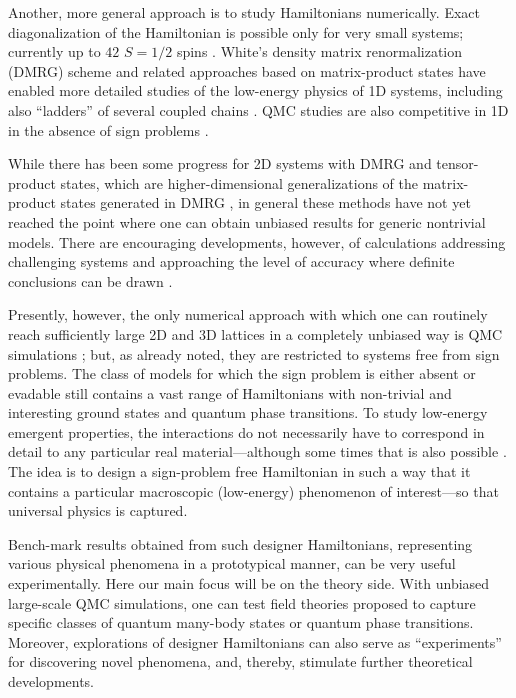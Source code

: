 \documentclass[10pt,pre,aps,twocolumn,showpacs,subscriptaddresses,floatfix]{revtex4}
\begin{document}
Another, more general approach is to study Hamiltonians numerically. Exact diagonalization of the Hamiltonian is possible 
only for very small systems; currently up to $42$ $S=1/2$ spins \cite{Nakano11,Lauchli11}. White's density matrix 
renormalization (DMRG) scheme \cite{White92} and related approaches based on matrix-product states \cite{Schollwock05} 
have enabled more detailed studies of the low-energy physics of 1D systems, including also ``ladders'' of several coupled chains
\cite{Dagotto96}. QMC studies are also competitive in 1D in the absence of sign problems \cite{Sandvik04,Jeckelmann02,Mund09}.

While there has been some progress for 2D systems with DMRG \cite{Stoudenmire12} and tensor-product \cite{Murg09,Gu08,Xie09} states, which are
higher-dimensional generalizations of the  matrix-product states generated in DMRG \cite{Rommer97}, in general these methods have not yet reached the point 
where one  can obtain unbiased results for generic nontrivial models. There are encouraging developments, however, of calculations addressing challenging systems and 
approaching the level of accuracy where definite conclusions can be drawn \cite{Yan11,Bauer12}.

Presently, however, the only numerical approach with which one can routinely reach sufficiently large 2D and 3D lattices in a completely unbiased way 
is QMC simulations \cite{Evertz03,Sandvik10b}; but, as already noted, they are restricted to systems free from sign problems. The class of models 
for which the sign problem is either absent or evadable
still contains a vast range of Hamiltonians with non-trivial and interesting 
ground states and quantum phase transitions. To study low-energy emergent properties, the interactions do not necessarily have to correspond in detail to 
any particular real material---although some times that is also possible \cite{Zvyagin07}. The idea is to design a sign-problem free Hamiltonian in such a way that it contains 
a particular macroscopic (low-energy) phenomenon of interest---so that universal physics is captured. 

Bench-mark results obtained from such designer Hamiltonians, representing various physical phenomena in a prototypical manner, can be very useful experimentally. 
Here our main focus will be on the theory side. With unbiased large-scale QMC simulations, one can test field theories proposed to capture specific classes of 
quantum many-body states or quantum phase transitions. Moreover, explorations of designer Hamiltonians can also serve as ``experiments'' for discovering 
novel phenomena, and, thereby, stimulate further theoretical developments.
\end{document}

